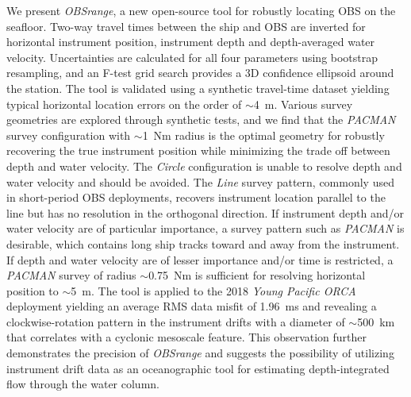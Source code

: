 We present \textit{OBSrange}, a new open-source tool for robustly locating OBS on the seafloor. Two-way travel times between the ship and OBS are inverted for horizontal instrument position, instrument depth and depth-averaged water velocity. Uncertainties are calculated for all four parameters using bootstrap resampling, and an F-test grid search provides a 3D confidence ellipsoid around the station. The tool is validated using a synthetic travel-time dataset yielding typical horizontal location errors on the order of $\sim$4~m. Various survey geometries are explored through synthetic tests, and we find that the \textit{PACMAN} survey configuration with $\sim$1~Nm radius is the optimal geometry for robustly recovering the true instrument position while minimizing the trade off between depth and water velocity. The \textit{Circle} configuration is unable to resolve depth and water velocity and should be avoided. The \textit{Line} survey pattern, commonly used in short-period OBS deployments, recovers instrument location parallel to the line but has no resolution in the orthogonal direction. If instrument depth and/or water velocity are of particular importance, a survey pattern such as \textit{PACMAN} is desirable, which contains long ship tracks toward and away from the instrument. If depth and water velocity are of lesser importance and/or time is restricted, a \textit{PACMAN} survey of radius $\sim$0.75~Nm is sufficient for resolving horizontal position to $\sim$5~m. The tool is applied to the 2018 \textit{Young Pacific ORCA} deployment yielding an average RMS data misfit of 1.96~ms and revealing a clockwise-rotation pattern in the instrument drifts with a diameter of $\sim$500~km that correlates with a cyclonic mesoscale feature. This observation further demonstrates the precision of \textit{OBSrange} and suggests the possibility of utilizing instrument drift data as an oceanographic tool for estimating depth-integrated flow through the water column.



